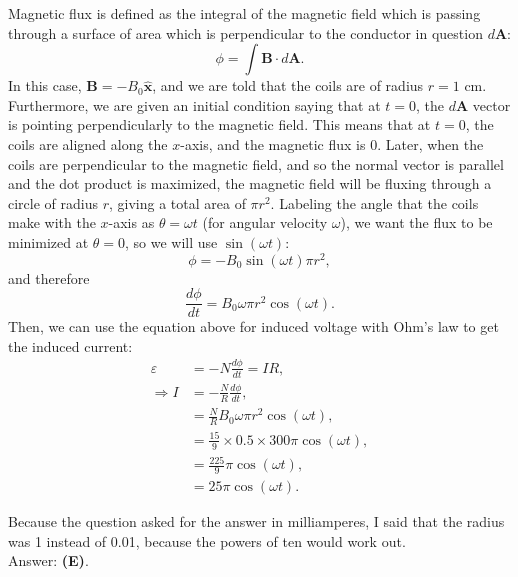 \documentclass[11pt]{paper}
\newcommand{\answer}[1]{Answer: \textbf{(#1)}.}
\begin{document}
Magnetic flux is defined as the integral of the magnetic field which is passing through a surface of area which is perpendicular to the conductor in question $d\mathbf{A}$:
\begin{equation}
	\phi = \int \mathbf{B}\cdot d\mathbf{A}.
\end{equation}
In this case, $\mathbf{B} = -B_0\mathbf{\hat{x}}$, and we are told that the coils are of radius $r = 1 \text{ cm}$.  Furthermore, we are given an initial condition saying that at $t=0$, the $d\mathbf{A}$ vector is pointing perpendicularly to the magnetic field.  This means that at $t=0$, the coils are aligned along the $x$-axis, and the magnetic flux is 0.  Later, when the coils are perpendicular to the magnetic field, and so the normal vector is parallel and the dot product is maximized, the magnetic field will be fluxing through a circle of radius $r$, giving a total area of $\pi r^2$.  Labeling the angle that the coils make with the $x$-axis as $\theta = \omega t$ (for angular velocity $\omega$), we want the flux to be minimized at $\theta = 0$, so we will use $\sin(\omega t)$:
\begin{equation}
	\phi = -B_0 \sin\left(\omega t\right)\pi r^2,
\end{equation}
and therefore
\begin{equation}
	\frac{d\phi}{dt} = B_0 \omega \pi r^2 \cos\left(\omega t\right).
\end{equation}
Then, we can use the equation above for induced voltage with Ohm's law to get the induced current:
\begin{align}
	\varepsilon &= -N\frac{d\phi}{dt} = IR,\\
	\Rightarrow I &= -\frac{N}{R}\frac{d\phi}{dt},\\
	&= \frac{N}{R}B_0 \omega \pi r^2 \cos\left(\omega t\right),\\
	&= \frac{15}{9}\times 0.5\times 300 \pi \cos\left(\omega t\right),\\
	&= \frac{225}{9}\pi \cos\left(\omega t\right),\\
	&= 25\pi\cos\left(\omega t\right).
\end{align}

Because the question asked for the answer in milliamperes, I said that the radius was 1 instead of 0.01, because the powers of ten would work out.\\

\answer{E}
\end{document}
